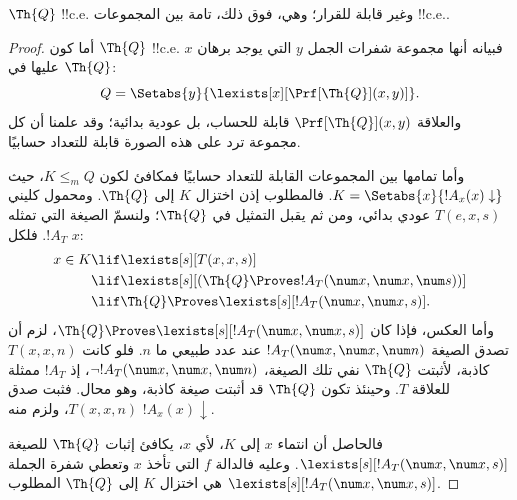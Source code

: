 \documentclass[../../../include/open-logic-section]{subfiles}
\begin{document}



\begin{thm}
$\Th{Q}$ !!{c.e.} وغير قابلة للقرار؛ وهي، فوق ذلك، تامة بين المجموعات
!!{c.e.}.
\end{thm}

\begin{proof}
أما كون $\Th{Q}$ !!{c.e.} فبيانه أنها مجموعة شفرات الجمل
$y$ التي يوجد برهان $x$ عليها في $\Th{Q}$:
\[
Q = \Setabs{y}{\lexists[x][\Prf[\Th{Q}](x,y)]}.
\]
والعلاقة $\Prf[\Th{Q}](x,y)$ قابلة للحساب، بل عودية بدائية؛ وقد
علمنا أن كل مجموعة ترد على هذه الصورة قابلة للتعداد حسابيًا.

وأما تمامها بين المجموعات القابلة للتعداد حسابيًا فمكافئ لكون
$K\leq_m Q$، حيث $K=\Setabs{x}{!A_x(x)\downarrow}$. فالمطلوب إذن
اختزال $K$ إلى $\Th{Q}$. ومحمول كليني $T(e,x,s)$ عودي بدائي، ومن ثم
يقبل التمثيل في $\Th{Q}$؛ ولنسمّ الصيغة التي تمثله $!A_T$. فلكل $x$:
\begin{align*}
x \in K & \lif \lexists[s][T(x,x,s)] \\
& \lif \lexists[s][(\Th{Q} \Proves !A_T(\num x,\num x, \num s))]
  \\
& \lif \Th{Q} \Proves \lexists[s][!A_T(\num x, \num x, s)].
\end{align*}
وأما العكس، فإذا كان
$\Th{Q}\Proves\lexists[s][!A_T(\num x,\num x,s)]$، لزم أن تصدق
الصيغة $!A_T(\num x,\num x,\num n)$ عند عدد طبيعي ما $n$.
فلو كانت $T(x,x,n)$ كاذبة، لأثبتت $\Th{Q}$ نفي تلك الصيغة،
$\lnot !A_T(\num x,\num x,\num n)$، إذ $!A_T$ ممثلة للعلاقة $T$.
وحينئذ تكون $\Th{Q}$ قد أثبتت صيغة كاذبة، وهو محال. فثبت صدق
$T(x,x,n)$، ولزم منه $!A_x(x)\downarrow$.

فالحاصل أن انتماء $x$ إلى $K$، لأي $x$، يكافئ إثبات
$\Th{Q}$ للصيغة $\lexists[s][!A_T(\num x,\num x,s)]$.
وعليه فالدالة $f$ التي تأخذ $x$ وتعطي شفرة الجملة
$\lexists[s][!A_T(\num x,\num x,s)]$ هي اختزال $K$ إلى
$\Th{Q}$ المطلوب.
\end{proof}
\end{document}
